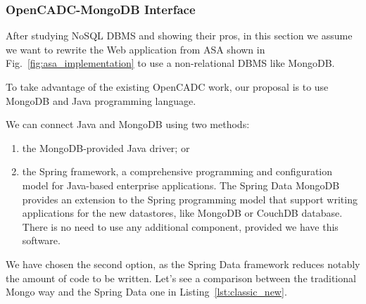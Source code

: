 \subsubsection{OpenCADC-MongoDB Interface}

After studying NoSQL DBMS and showing their pros, in this section we assume we want to rewrite the Web application from ASA shown in Fig.~\ref{fig:asa_implementation} to use a non-relational DBMS like MongoDB.

To take advantage of the existing OpenCADC work, our proposal is to use MongoDB and Java programming language.

We
can
connect Java and MongoDB using two methods:

\begin{enumerate}

\item the MongoDB-provided Java driver; or

\item the Spring framework, a comprehensive programming and configuration model for Java-based enterprise applications. The Spring Data MongoDB  provides an extension to the Spring programming model that support writing applications for the new datastores, like MongoDB or CouchDB database. There is no need to use any additional component, provided we have this software.

\end{enumerate}

We have chosen the second option, as
the
Spring Data framework reduces notably the amount of code to be written. Let's see a comparison between the traditional Mongo way and the Spring Data one in Listing~\ref{lst:classic_new}.


